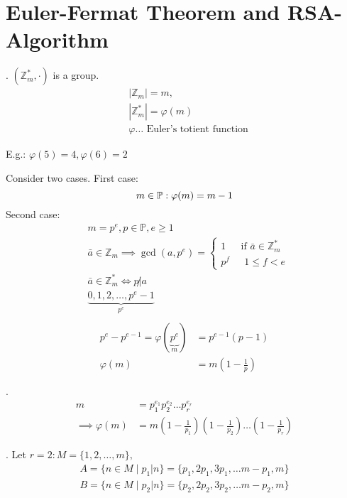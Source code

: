 \section{Euler-Fermat Theorem and RSA-Algorithm}

\Theorem.
$(\mathbb{Z}_m^{*}, \cdot)$ is a group.
\begin{align*}
  &|\mathbb{Z}_m| = m, \\
  &|\mathbb{Z}_m^{*}| = \varphi(m) \\
  &\varphi \ldots \text{ Euler's totient function}
\end{align*}

E.g.: $\varphi(5) = 4, \varphi(6) = 2$

Consider two cases. First case:
\[
  m \in \mathbb{P}: \varphi(m) = m-1 \\
\]
Second case:
\begin{align*}
  &m = p^e, p \in \mathbb{P}, e \geq 1 \\
  &\bar{a}\in \mathbb{Z}_m \implies \gcd(a,p^e) = \begin{cases}
    1   &\text{ if $\bar{a} \in \mathbb{Z}_m^{*}$} \\
    p^f &\text{ $1 \leq f < e$}
  \end{cases} \\
  &\bar{a}\in \mathbb{Z}_m^{*} \Leftrightarrow p \not|a \\
  & \underbrace{0,1,2, \ldots, p^e -1}_{p^e}\\
\end{align*}\vspace{-1.5cm}
\begin{align*}
  p^e - p^{e-1} = \varphi(\underbrace{p^e}_{m}) &= p^{e-1}(p-1) \\
                \varphi(m) &= m\left(1-\frac{1}{p}\right)
\end{align*}

\Theorem.
\begin{align*}
  m &= p_1^{e_1} p_2^{e_2} \ldots p_r^{e_r} \\
  \implies \varphi(m) &= m \left( 1-\frac{1}{p_1} \right) \left( 1-\frac{1}{p_2} \right) \ldots \left( 1-\frac{1}{p_r} \right)
\end{align*}

\Proof.
Let $r=2: M = \{1,2, \ldots, m\},$
\begin{align*}
  A = \{ n \in M \mid p_1|n\} = \{p_1, 2p_1, 3p_1, \ldots m-p_1, m\} \\
  B = \{ n \in M \mid p_2|n\} = \{p_2, 2p_2, 3p_2, \ldots m-p_2, m\} \\
\end{align*}

